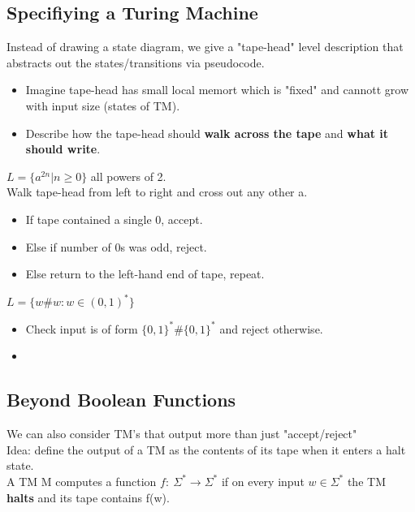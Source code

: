 \subsection{Specifiying a Turing Machine}
Instead of drawing a state diagram, we give a "tape-head" level description that abstracts out the states/transitions via pseudocode.
\begin{itemize}
  \item Imagine tape-head has small local memort which is "fixed" and cannott grow with input size (states of TM).
  \item Describe how the tape-head should \textbf{walk across the tape} and \textbf{what it should write}.
\end{itemize}
\begin{example}
  $L = \{a^{2n} | n \geq 0\}$ all powers of 2.
  \\
  Walk tape-head from left to right and cross out any other a.
  \begin{itemize}
    \item If tape contained a single 0, accept.
    \item Else if number of 0s was odd, reject.
    \item Else return to the left-hand end of tape, repeat. 
  \end{itemize}
\end{example}
\begin{example}
  $L = \{ w \# w: w \in (0,1)^{*} \}$
  \begin{itemize}
    \item Check input is of form $\{0, 1\}^* \# \{0, 1\}^*$ and reject otherwise.
    \item 
  \end{itemize}
\end{example}

\subsection{Beyond Boolean Functions}
We can also consider TM's that output more than just "accept/reject"
\\
Idea: define the output of a TM as the contents of its tape when it enters a halt state.
\\
A TM M computes a function $f: \: \Sigma^* \to \Sigma^*$ if on every input $w \in \Sigma^*$ the TM \textbf{halts} and its tape contains f(w).

